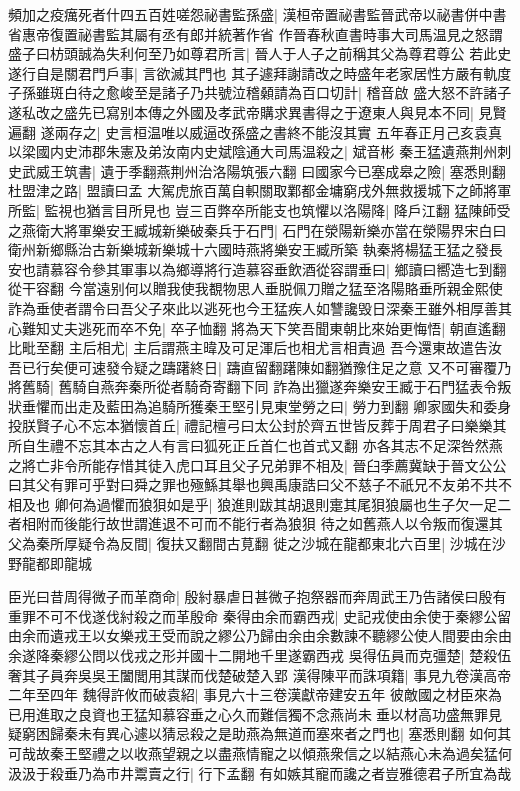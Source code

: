 頻加之疫癘死者什四五百姓嗟怨祕書監孫盛|{
	漢桓帝置祕書監晉武帝以祕書併中書省惠帝復置祕書監其屬有丞有郎并統著作省}
作晉春秋直書時事大司馬温見之怒謂盛子曰枋頭誠為失利何至乃如尊君所言|{
	晉人于人子之前稱其父為尊君尊公}
若此史遂行自是關君門戶事|{
	言欲滅其門也}
其子遽拜謝請改之時盛年老家居性方嚴有軌度子孫雖斑白待之愈峻至是諸子乃共號泣稽顙請為百口切計|{
	稽音啟}
盛大怒不許諸子遂私改之盛先已寫别本傳之外國及孝武帝購求異書得之于遼東人與見本不同|{
	見賢遍翻}
遂兩存之|{
	史言桓温唯以威逼改孫盛之書終不能沒其實}
五年春正月己亥袁真以梁國内史沛郡朱憲及弟汝南内史斌陰通大司馬温殺之|{
	斌音彬}
秦王猛遺燕荆州刺史武威王筑書|{
	遺于季翻燕荆州治洛陽筑張六翻}
曰國家今已塞成皋之險|{
	塞悉則翻}
杜盟津之路|{
	盟讀曰孟}
大駕虎旅百萬自軹關取鄴都金墉窮戌外無救援城下之師將軍所監|{
	監視也猶言目所見也}
豈三百弊卒所能支也筑懼以洛陽降|{
	降戶江翻}
猛陳師受之燕衛大將軍樂安王臧城新樂破秦兵于石門|{
	石門在滎陽新樂亦當在滎陽界宋白曰衛州新鄉縣治古新樂城新樂城十六國時燕將樂安王臧所築}
執秦將楊猛王猛之發長安也請慕容令參其軍事以為鄉導將行造慕容垂飲酒從容謂垂曰|{
	鄉讀曰嚮造七到翻從干容翻}
今當遠别何以贈我使我覩物思人垂脱佩刀贈之猛至洛陽賂垂所親金熙使詐為垂使者謂令曰吾父子來此以逃死也今王猛疾人如讐讒毁日深秦王雖外相厚善其心難知丈夫逃死而卒不免|{
	卒子恤翻}
將為天下笑吾聞東朝比來始更悔悟|{
	朝直遙翻比毗至翻}
主后相尤|{
	主后謂燕主暐及可足渾后也相尤言相責過}
吾今還東故遣告汝吾已行矣便可速發令疑之躊躇終日|{
	躊直留翻躇陳如翻猶豫住足之意}
又不可審覆乃將舊騎|{
	舊騎自燕奔秦所從者騎奇寄翻下同}
詐為出獵遂奔樂安王臧于石門猛表令叛狀垂懼而出走及藍田為追騎所獲秦王堅引見東堂勞之曰|{
	勞力到翻}
卿家國失和委身投朕賢子心不忘本猶懷首丘|{
	禮記檀弓曰太公封於齊五世皆反葬于周君子曰樂樂其所自生禮不忘其本古之人有言曰狐死正丘首仁也首式又翻}
亦各其志不足深咎然燕之將亡非令所能存惜其徒入虎口耳且父子兄弟罪不相及|{
	晉臼季薦冀缺于晉文公公曰其父有罪可乎對曰舜之罪也殛鯀其舉也興禹康誥曰父不慈子不祇兄不友弟不共不相及也}
卿何為過懼而狼狽如是乎|{
	狼進則跋其胡退則疐其尾狽狼屬也生子欠一足二者相附而後能行故世謂進退不可而不能行者為狼狽}
待之如舊燕人以令叛而復還其父為秦所厚疑令為反間|{
	復扶又翻間古莧翻}
徙之沙城在龍都東北六百里|{
	沙城在沙野龍都即龍城}


臣光曰昔周得微子而革商命|{
	殷紂暴虐日甚微子抱祭器而奔周武王乃告諸侯曰殷有重罪不可不伐遂伐紂殺之而革殷命}
秦得由余而霸西戎|{
	史記戎使由余使于秦繆公留由余而遺戎王以女樂戎王受而說之繆公乃歸由余由余數諫不聽繆公使人間要由余由余遂降秦繆公問以伐戎之形并國十二開地千里遂霸西戎}
吳得伍員而克彊楚|{
	楚殺伍奢其子員奔吳吳王闔閭用其謀而伐楚破楚入郢}
漢得陳平而誅項籍|{
	事見九卷漢高帝二年至四年}
魏得許攸而破袁紹|{
	事見六十三卷漢獻帝建安五年}
彼敵國之材臣來為已用進取之良資也王猛知慕容垂之心久而難信獨不念燕尚未垂以材高功盛無罪見疑窮困歸秦未有異心遽以猜忌殺之是助燕為無道而塞來者之門也|{
	塞悉則翻}
如何其可哉故秦王堅禮之以收燕望親之以盡燕情寵之以傾燕衆信之以結燕心未為過矣猛何汲汲于殺垂乃為市井鬻賣之行|{
	行下孟翻}
有如嫉其寵而讒之者豈雅德君子所宜為哉


